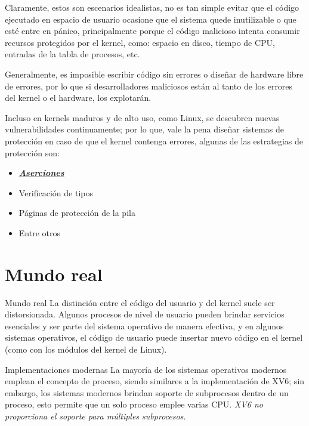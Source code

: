 \documentclass{libs/ufc_format}
\begin{document}
\begin{frame}{}
    Claramente, estos son escenarios idealistas, no es tan simple evitar que el código ejecutado en espacio de usuario ocasione que el sistema quede inutilizable o que esté entre en pánico, principalmente porque el código malicioso intenta consumir recursos protegidos por el kernel, como: espacio en disco, tiempo de CPU, entradas de la tabla de procesos, etc. \cite{xv6_book}

    \vspace{0.3cm}

    Generalmente, es imposible escribir código sin errores o diseñar de hardware libre de errores, por lo que si desarrolladores maliciosos están al tanto de los errores del kernel o el hardware, los explotarán. \cite{xv6_book}
\end{frame}
\begin{frame}{}
    Incluso en kernels maduros y de alto uso, como Linux, se descubren nuevas vulnerabilidades continuamente; por lo que, vale la pena diseñar sistemas de protección en caso de que el kernel contenga errores, algunas de las estrategias de protección son:

    \begin{itemize}
        \item \href{https://en.wikipedia.org/wiki/Assertion\_(software\_development)}{\textbf{\textit{Aserciones}}}
        \item Verificación de tipos
        \item Páginas de protección de la pila
        \item Entre otros
    \end{itemize}
\end{frame}
\section{Mundo real}
\begin{frame}{Mundo real}
    La distinción entre el código del usuario y del kernel suele ser distorsionada. Algunos procesos de nivel de usuario pueden brindar servicios esenciales y ser parte del sistema operativo de manera efectiva, y en algunos sistemas operativos, el código de usuario puede insertar nuevo código en el kernel (como con los módulos del kernel de Linux). \cite{xv6_book}
\end{frame}
\begin{frame}{Implementaciones modernas}
    La mayoría de los sistemas operativos modernos emplean el concepto de proceso, siendo similares a la implementación de XV6; sin embargo, los sistemas modernos brindan soporte de subprocesos dentro de un proceso, esto permite que un solo proceso emplee varias CPU. \newline
    \emph{XV6 no proporciona el soporte para múltiples subprocesos.}
\end{frame}
\end{document}
